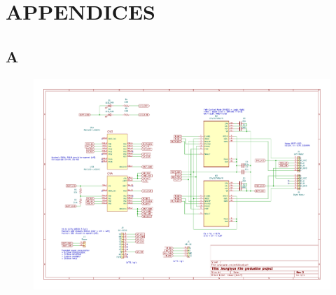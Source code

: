 \section*{APPENDICES} 						%

\subsection*{A} 
\label{appendix:schematic}
%
\begin{figure}[H]
    \centering
    \includegraphics[width=\textwidth]{figures/circuit.pdf}
    \label{fig:schematic}
\end{figure}
%
